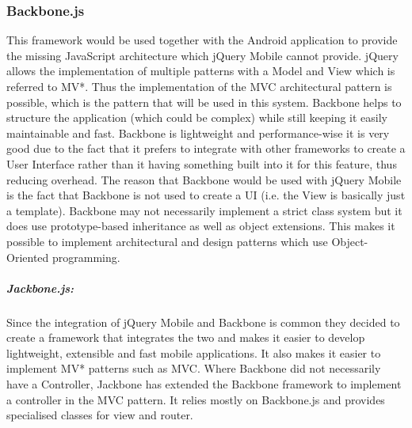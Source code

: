 \documentclass[a4paper,12pt]{article}
\begin{document}
\subsubsection{Backbone.js}
This framework would be used together with the Android application to provide the missing JavaScript architecture which jQuery Mobile cannot provide. jQuery allows the implementation of multiple patterns with a Model and View which is referred to MV*. Thus the implementation of the MVC architectural pattern is possible, which is the pattern that will be used in this system. Backbone helps to structure the application (which could be complex) while still keeping it easily maintainable and fast. Backbone is lightweight and performance-wise it is very good due to the fact that it prefers to integrate with other frameworks to create a User Interface rather than it having something built into it for this feature, thus reducing overhead. The reason that Backbone would be used with jQuery Mobile is the fact that Backbone is not used to create a UI (i.e. the View is basically just a template). Backbone may not necessarily implement a strict class system but it does use prototype-based inheritance as well as object extensions. This makes it possible to implement architectural and design patterns which use Object-Oriented programming.

\subparagraph{Jackbone.js:}
Since the integration of jQuery Mobile and Backbone is common they decided to create a framework that integrates the two and makes it easier to develop lightweight, extensible and fast mobile applications. It also makes it easier to implement MV* patterns such as MVC. Where Backbone did not necessarily have a Controller, Jackbone has extended the Backbone framework to implement a controller in the MVC pattern. It relies mostly on Backbone.js and provides specialised classes for view and router.

\end{document}
